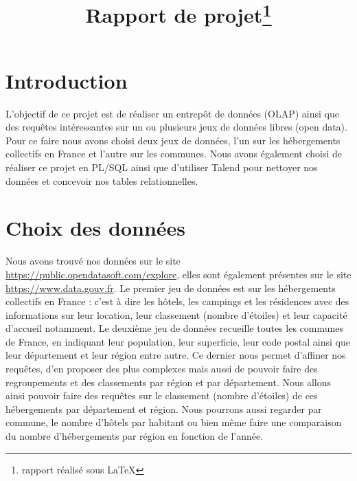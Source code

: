 \documentclass[a4paper,sffamily,12pt]{article}
\title{\vspace{\fill}\LARGE\bfseries\sffamily Rapport de projet\protect\footnote{rapport réalisé sous \LaTeX} \vspace{\fill}}
\begin{document}
	\date{} %
	\maketitle %

	\thispagestyle{fancy} %
	
	\newpage
			
	\renewcommand{\contentsname}{Sommaire}
	\tableofcontents
	
	\newpage
	
	\section{Introduction}

		\vspace{0.5cm}
		
		L'objectif de ce projet est de réaliser un entrepôt de données (OLAP) ainsi que des requêtes intéressantes sur un ou plusieurs jeux de données libres (open data). Pour ce faire nous avons choisi deux jeux de données, l'un sur les hébergements collectifs en France et l'autre sur les communes. Nous avons également choisi de réaliser ce projet en PL/SQL ainsi que d'utiliser Talend pour nettoyer nos données et concevoir nos tables relationnelles. \\

	\section{Choix des données}				

		\vspace{0.5cm}
		
		 Nous avons trouvé nos données sur le site \url{https://public.opendatasoft.com/explore}, elles sont également présentes sur le site \url{https://www.data.gouv.fr}. Le premier jeu de données est sur les hébergements collectifs en France : c'est à dire les hôtels, les campings et les résidences avec des informations sur leur location, leur classement (nombre d'étoiles) et leur capacité d'accueil notamment. Le deuxième jeu de données recueille toutes les communes de France, en indiquant leur population, leur superficie, leur code postal ainsi que leur département et leur région entre autre. Ce dernier nous permet d'affiner nos requêtes, d'en proposer des plus complexes mais aussi de pouvoir faire des regroupements et des classements par région et par département. Nous allons ainsi pouvoir faire des requêtes sur le classement (nombre d'étoiles) de ces hébergements par département et région. Nous pourrons aussi regarder par commune, le nombre d'hôtels par habitant ou bien même faire une comparaison du nombre d'hébergements par région en fonction de l'année. \\
\end{document}
